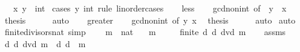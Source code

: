 \begin{isabellebody}
\ \ \ x\ y\ {\isacharcolon}{\kern0pt}{\isacharcolon}{\kern0pt}\ int\isanewline
%
\isadelimproof
%
\endisadelimproof
%
\isatagproof
{}\isamarkupfalse%
\ {\isacharparenleft}{\kern0pt}cases\ y\ {\isachardoublequoteopen}{}{\isacharcolon}{\kern0pt}{\isacharcolon}{\kern0pt}int{\isachardoublequoteclose}\ rule{\isacharcolon}{\kern0pt}\ linorder{\isacharunderscore}{\kern0pt}cases{\isacharparenright}{\kern0pt}\isanewline
\ \ \isamarkupfalse%
\ less\isanewline
\ \ \isamarkupfalse%
\ gcd{\isacharunderscore}{\kern0pt}non{\isacharunderscore}{\kern0pt}{}{\isacharunderscore}{\kern0pt}int\ {\isacharbrackleft}{\kern0pt}of\ {\isachardoublequoteopen}{\isacharminus}{\kern0pt}\ y{\isachardoublequoteclose}\ {\isachardoublequoteopen}{\isacharminus}{\kern0pt}\ x{\isachardoublequoteclose}{\isacharbrackright}{\kern0pt}\ \isamarkupfalse%
\ {\isacharquery}{\kern0pt}thesis\isanewline
\ \ \ \ \isamarkupfalse%
\ auto\isanewline
{}\isamarkupfalse%
\isanewline
\ \ \isamarkupfalse%
\ greater\isanewline
\ \ \isamarkupfalse%
\ gcd{\isacharunderscore}{\kern0pt}non{\isacharunderscore}{\kern0pt}{}{\isacharunderscore}{\kern0pt}int\ {\isacharbrackleft}{\kern0pt}of\ y\ x{\isacharbrackright}{\kern0pt}\ \isamarkupfalse%
\ {\isacharquery}{\kern0pt}thesis\isanewline
\ \ \ \ \isamarkupfalse%
\ auto\isanewline
{}\isamarkupfalse%
\ auto%
\endisatagproof
{\isafoldproof}%
%
\isadelimproof
\isanewline
%
\endisadelimproof
\isanewline
\isanewline
\isanewline
\isanewline
\isanewline
{}\isamarkupfalse%
\ finite{\isacharunderscore}{\kern0pt}divisors{\isacharunderscore}{\kern0pt}nat\ {\isacharbrackleft}{\kern0pt}simp{\isacharbrackright}{\kern0pt}{\isacharcolon}{\kern0pt}\ \isanewline
\ \ \ m\ {\isacharcolon}{\kern0pt}{\isacharcolon}{\kern0pt}\ nat\isanewline
\ \ \ {\isachardoublequoteopen}m\ {\isachargreater}{\kern0pt}\ {}{\isachardoublequoteclose}\isanewline
\ \ \ {\isachardoublequoteopen}finite\ {\isacharbraceleft}{\kern0pt}d{\isachardot}{\kern0pt}\ d\ dvd\ m{\isacharbraceright}{\kern0pt}{\isachardoublequoteclose}\isanewline
%
\isadelimproof
%
\endisadelimproof
%
\isatagproof
{}\isamarkupfalse%
{\isacharminus}{\kern0pt}\isanewline
\ \ \isamarkupfalse%
\ assms\ \isamarkupfalse%
\ {\isachardoublequoteopen}{\isacharbraceleft}{\kern0pt}d{\isachardot}{\kern0pt}\ d\ dvd\ m{\isacharbraceright}{\kern0pt}\ {\isasymsubseteq}\ {\isacharbraceleft}{\kern0pt}d{\isachardot}{\kern0pt}\ d\ {\isasymle}\ m{\isacharbraceright}{\kern0pt}{\isachardoublequoteclose}\isanewline

\end{isabellebody}
